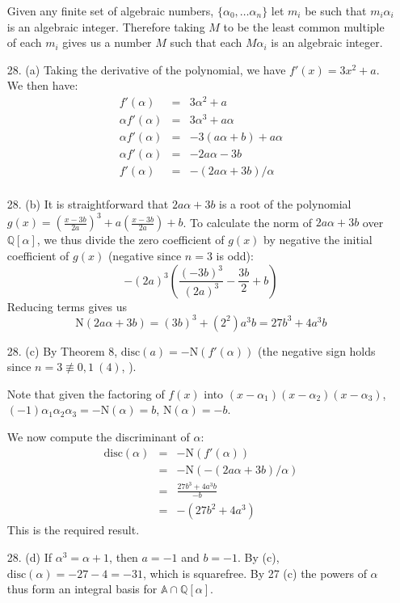 \documentclass{article}
\newcommand{\Q}[0]{\mathbb{Q}}
\newcommand{\norm}[1]{\text{N}(#1)}
\newcommand{\disc}[1]{\text{disc}(#1)}
\begin{document}
\begin{enumerate}
Given any finite set of algebraic numbers, $\{\alpha_0, \ldots \alpha_n \}$ let $m_i$ be such that $m_i \alpha_i$ is an algebraic integer.  Therefore taking $M$ to be the least common multiple of each $m_i$ gives us a number $M$ such that each $M\alpha_i$ is an algebraic integer.

\item [28. (a)] Taking the derivative of the polynomial, we have $f'(x) = 3x^2 + a$.  We then have:
\begin{eqnarray*}
    f'(\alpha) &=& 3\alpha^2 + a \\
    \alpha f'(\alpha) &=& 3\alpha^3 + a\alpha \\
    \alpha f'(\alpha) &=& -3(a\alpha + b) + a\alpha \\
    \alpha f'(\alpha) &=& -2a\alpha - 3b \\
    f'(\alpha) &=& -(2a\alpha + 3b) / \alpha \\
\end{eqnarray*}

\item [28. (b)] It is straightforward that $2a\alpha + 3b$ is a root of the polynomial $g(x) = (\frac{x - 3b}{2a})^3 + a(\frac{x - 3b}{2a}) + b$.  To calculate the norm of $2a\alpha + 3b$ over $\Q[\alpha]$, we thus divide the zero coefficient of $g(x)$ by negative the initial coefficient of $g(x)$ (negative since $n = 3$ is odd):
\[ -(2a)^3\left(\frac{(-3b)^3}{(2a)^3} - \frac{3b}{2} + b\right) \]
Reducing terms gives us
\[ \norm{2a\alpha + 3b} = (3b)^3 + (2^2)a^3b = 27b^3 + 4a^3b \]

\item[28. (c)] By Theorem 8, $\disc{a} = -\norm{f'(\alpha)}$ (the negative sign holds since $n = 3 \not\equiv 0,1 \ (4)$, ).

Note that given the factoring of $f(x)$ into $(x - \alpha_1)(x - \alpha_2)(x - \alpha_3)$, $(-1)\alpha_1\alpha_2\alpha_3 = -\norm{\alpha} = b$, $\norm{\alpha} = -b$.

We now compute the discriminant of $\alpha$:
\begin{eqnarray*}
    \disc{\alpha} &=& -\norm{f'(\alpha)} \\
                    &=& -\norm{-(2a\alpha + 3b)/\alpha} \\
                    &=& \frac{27b^3 + 4a^3b}{-b} \\
                    &=& -(27b^2 + 4a^3)
\end{eqnarray*}
This is the required result.

\item[28. (d)] If $\alpha^3 = \alpha + 1$, then $a = -1$ and $b = -1$.  By (c), $\disc{\alpha} = -27 - 4 = -31$, which is squarefree.  By 27 (c) the powers of $\alpha$ thus form an integral basis for $\mathbb{A} \cap \Q[\alpha]$.


\end{enumerate}
\end{document}
